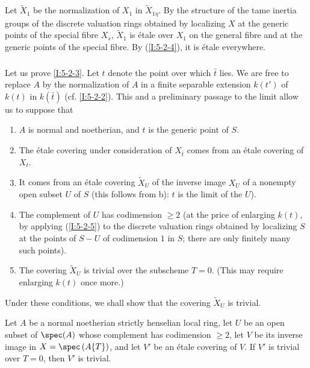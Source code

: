 Let $\widetilde X_1$ be the normalization of $X_1$ in
$\widetilde X_{1\eta}$. By the structure of the tame inertia groups of
the discrete valuation rings obtained by localizing $X$ at the generic
points of the special fibre $X_s$, $\widetilde X_1$ is étale over $X_1$
on the general fibre and at the generic points of the special fibre. By
(\ref{I:5-2-4}), it is étale everywhere.

\begingroup
\renewcommand*{\thesubsubsection}{2.3.3}
\subsubsection{}\label{I:5-2-6}
\endgroup %

Let us prove \ref{I:5-2-3}. Let $t$ denote the point over which $\bar t$ lies. We are free to replace
$A$ by the normalization of $A$ in a finite separable extension $k(t')$ of
$k(t)$ in $k(\bar t)$ (cf. \ref{I:5-2-2}). This and a preliminary
passage to the limit allow us to suppose that
\begin{enumerate}[\indent a)]
  \item $A$ is normal and noetherian, and $t$ is the generic point of $S$.
  \item The étale covering under consideration of $X_{\bar t}$ comes from
    an étale covering of $X_t$.
  \item It comes from an étale covering $\widetilde X_U$ of the inverse
    image $X_U$ of a nonempty open subset $U$ of $S$ (this follows from
    b): $t$ is the limit of the $U$).
  \item The complement of $U$ has codimension $\geqslant2$ (at the price
    of enlarging $k(t)$, by applying (\ref{I:5-2-5}) to the discrete
    valuation rings obtained by localizing $S$ at the points of
    $S- U$ of codimension $1$ in $S$; there are only finitely many
    such points).
  \item The covering $\widetilde X_U$ is trivial over the subscheme $T=0$.
    (This may require enlarging $k(t)$ once more.)
\end{enumerate}

Under these conditions, we shall show that the covering
$\widetilde X_U$ is trivial.

\begingroup
\renewcommand*{\thesubsubsection}{2.3.4}
\begin{lemma}\label{I:5-2-7} %
Let $A$ be a normal noetherian strictly henselian local ring, let $U$
be an open subset of $\spec(A)$ whose complement has codimension
$\geqslant2$, let $V$ be its inverse image in
$X=\spec\left(A\{T\}\right)$, and let $V'$ be an étale covering of
$V$. If $V'$ is trivial over $T=0$, then $V'$ is trivial.
\end{lemma}
\endgroup

